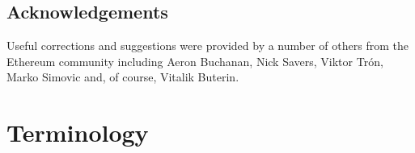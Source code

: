 \documentclass[9pt,oneside]{amsart}
\begin{document}
\begin{multicols}{2}
\section{Acknowledgements}

Useful corrections and suggestions were provided by a number of others from the Ethereum community including Aeron Buchanan, Nick Savers, Viktor Tr\'{o}n, Marko Simovic and, of course, Vitalik Buterin.




\end{multicols}

\appendix

\section{Terminology}
\end{document}
